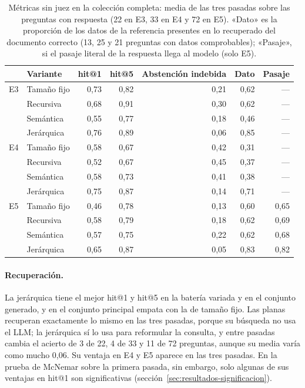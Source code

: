 \begin{table}[htbp]
\centering\small
\setlength{\tabcolsep}{4pt}
\caption[Métricas sin juez en la colección completa]{Métricas sin juez en la colección completa: media de las tres pasadas sobre las preguntas con respuesta (22 en E3, 33 en E4 y 72 en E5). «Dato» es la proporción de los datos de la referencia presentes en lo recuperado del documento correcto (13, 25 y 21 preguntas con datos comprobables); «Pasaje», si el pasaje literal de la respuesta llega al modelo (solo E5).}
\label{tab:sin-juez}
\begin{tabular}{@{}l l rrrr r@{}}
\toprule
& \textbf{Variante} & \textbf{hit@1} & \textbf{hit@5} & \textbf{Abstención indebida} & \textbf{Dato} & \textbf{Pasaje} \\
\midrule
E3 & Tamaño fijo & 0,73 & 0,82 & 0,21 & 0,62 & --- \\
   & Recursiva   & 0,68 & 0,91 & 0,30 & 0,62 & --- \\
   & Semántica   & 0,55 & 0,77 & 0,18 & 0,46 & --- \\
   & Jerárquica  & 0,76 & 0,89 & 0,06 & 0,85 & --- \\
\midrule
E4 & Tamaño fijo & 0,58 & 0,67 & 0,42 & 0,31 & --- \\
   & Recursiva   & 0,52 & 0,67 & 0,45 & 0,37 & --- \\
   & Semántica   & 0,58 & 0,73 & 0,41 & 0,38 & --- \\
   & Jerárquica  & 0,75 & 0,87 & 0,14 & 0,71 & --- \\
\midrule
E5 & Tamaño fijo & 0,46 & 0,78 & 0,13 & 0,60 & 0,65 \\
   & Recursiva   & 0,58 & 0,79 & 0,18 & 0,62 & 0,69 \\
   & Semántica   & 0,57 & 0,75 & 0,22 & 0,62 & 0,68 \\
   & Jerárquica  & 0,65 & 0,87 & 0,05 & 0,83 & 0,82 \\
\bottomrule
\end{tabular}
\end{table}

\paragraph{Recuperación.} La jerárquica tiene el mejor hit@1 y hit@5 en la batería variada y en el conjunto generado, y en el conjunto principal empata con la de tamaño fijo. Las planas recuperan exactamente lo mismo en las tres pasadas, porque su búsqueda no usa el LLM; la jerárquica sí lo usa para reformular la consulta, y entre pasadas cambia el acierto de 3 de 22, 4 de 33 y 11 de 72 preguntas, aunque su media varía como mucho 0,06. Su ventaja en E4 y E5 aparece en las tres pasadas. En la prueba de McNemar sobre la primera pasada, sin embargo, solo algunas de sus ventajas en hit@1 son significativas (sección~\ref{sec:resultados-significacion}).

